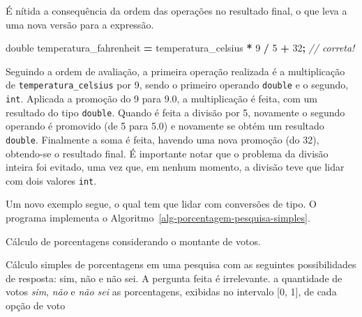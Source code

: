 \documentclass[
  11pt,
  a4paper,
]{scrbook}
\newenvironment{Shaded}{\begin{snugshade}}{\end{snugshade}}
\newcommand{\CommentTok}[1]{\textcolor[rgb]{0.56,0.35,0.01}{\textit{#1}}}
\newcommand{\DataTypeTok}[1]{\textcolor[rgb]{0.13,0.29,0.53}{#1}}
\newcommand{\DecValTok}[1]{\textcolor[rgb]{0.00,0.00,0.81}{#1}}
\newcommand{\NormalTok}[1]{#1}
\newcommand{\OperatorTok}[1]{\textcolor[rgb]{0.81,0.36,0.00}{\textbf{#1}}}
\begin{document}
É nítida a consequência da ordem das operações no resultado final, o que
leva a uma nova versão para a expressão.

\begin{Shaded}
\begin{Highlighting}[]
\DataTypeTok{double}\NormalTok{ temperatura\_fahrenheit }\OperatorTok{=}\NormalTok{ temperatura\_celsius }\OperatorTok{*} \DecValTok{9} \OperatorTok{/} \DecValTok{5} \OperatorTok{+} \DecValTok{32}\OperatorTok{;}  \CommentTok{// correta!}
\end{Highlighting}
\end{Shaded}

Seguindo a ordem de avaliação, a primeira operação realizada é a
multiplicação de \texttt{temperatura\_celsius} por 9, sendo o primeiro
operando \texttt{double} e o segundo, \texttt{int}. Aplicada a promoção
do 9 para 9.0, a multiplicação é feita, com um resultado do tipo
\texttt{double}. Quando é feita a divisão por 5, novamente o segundo
operando é promovido (de 5 para 5.0) e novamente se obtém um resultado
\texttt{double}. Finalmente a soma é feita, havendo uma nova promoção
(do 32), obtendo-se o resultado final. É importante notar que o problema
da divisão inteira foi evitado, uma vez que, em nenhum momento, a
divisão teve que lidar com dois valores \texttt{int}.

Um novo exemplo segue, o qual tem que lidar com conversões de tipo. O
programa implementa o Algoritmo~\ref{alg-porcentagem-pesquisa-simples}.

\begin{algorithm}
\caption{\label{alg-porcentagem-pesquisa-simples}Cálculo de porcentagens
considerando o montante de votos.}
\begingroup%


\begin{algorithmic}
    \Description Cálculo simples de porcentagens em uma pesquisa com as seguintes possibilidades de resposta: sim, não e não sei. A pergunta feita é irrelevante.
    \Require a quantidade de votos \textit{sim}, \textit{não} e \textit{não sei}
    \Ensure as porcentagens, exibidas no intervalo [0, 1], de cada opção de voto

\end{algorithmic}

\endgroup
\end{algorithm}
\end{document}
